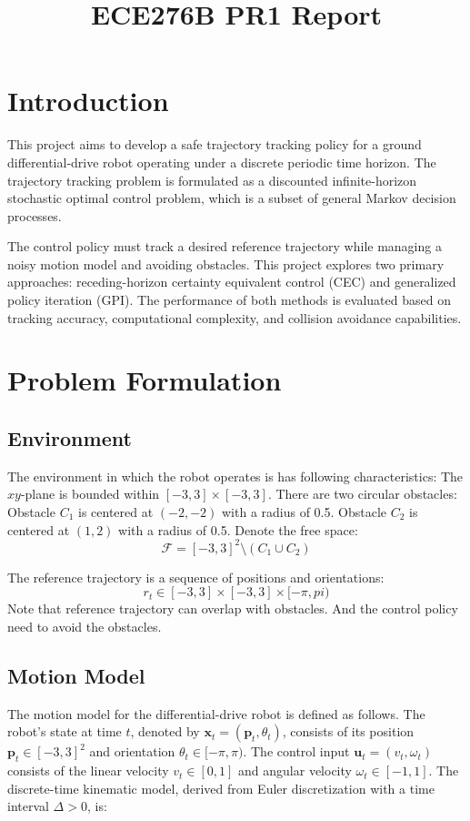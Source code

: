 \documentclass[conference]{IEEEtran}
\begin{document}
\title{ECE276B PR1 Report}

\author{
}

\maketitle

\section{Introduction}
This project aims to develop a safe trajectory tracking policy 
for a ground differential-drive robot operating 
under a discrete periodic time horizon.
The trajectory tracking problem is formulated as a 
discounted infinite-horizon stochastic optimal control problem, 
which is a subset of general Markov decision processes.

The control policy must track a desired reference trajectory 
while managing a noisy motion model and avoiding obstacles. 
This project explores two primary approaches: 
receding-horizon certainty equivalent control (CEC) and generalized policy iteration (GPI). 
The performance of both methods is evaluated based on 
tracking accuracy, computational complexity, and collision avoidance capabilities.


\section{Problem Formulation}
\subsection{Environment}
The environment in which the robot operates is has following characteristics:
The \(xy\)-plane is bounded within \([-3, 3] \times [-3, 3]\).
There are two circular obstacles:
Obstacle \( C_1 \) is centered at \((-2, -2)\) with a radius of 0.5.
Obstacle \( C_2 \) is centered at \((1, 2)\) with a radius of 0.5.
Denote the free space:
\[ \mathcal{F} = [-3, 3]^2 \setminus (C_1 \cup C_2) \]

The reference trajectory is a sequence of positions and orientations:
\[ r_t \in [-3,3] \times [-3,3] \times [-\pi, pi)\]
Note that reference trajectory can overlap with obstacles.
And the control policy need to avoid the obstacles.

\subsection{Motion Model}
The motion model for the differential-drive robot is defined as follows. 
The robot's state at time \( t \), denoted by 
\( \mathbf{x}_t = (\mathbf{p}_t, \theta_t) \), 
consists of its position \( \mathbf{p}_t \in [-3,3]^2 \) and orientation \( \theta_t \in [-\pi, \pi) \). 
The control input \( \mathbf{u}_t = (v_t, \omega_t) \) 
consists of the linear velocity \( v_t \in [0,1] \) and 
angular velocity \( \omega_t \in [-1,1] \). 
The discrete-time kinematic model, 
derived from Euler discretization with a time interval \( \Delta > 0 \), is:
\end{document}
